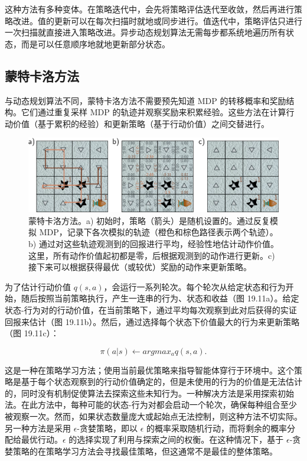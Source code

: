 这种方法有多种变体。在策略迭代中，会先将策略评估迭代至收敛，然后再进行策略改进。值的更新可以在每次扫描时就地或同步进行。值迭代中，策略评估只进行一次扫描就直接进入策略改进。异步动态规划算法无需每步都系统地遍历所有状态，而是可以任意顺序地就地更新部分状态。

\subsection{蒙特卡洛方法}
与动态规划算法不同，蒙特卡洛方法不需要预先知道 MDP 的转移概率和奖励结构。它们通过重复采样 MDP 的轨迹并观察奖励来积累经验。这些方法在计算行动价值（基于累积的经验）和更新策略（基于行动价值）之间交替进行。

\begin{figure}[ht!]
\centering
\includegraphics[width=0.7\linewidth]{png/chapter19/ReinforceMC.png}
\caption{蒙特卡洛方法。a) 初始时，策略（箭头）是随机设置的。通过反复模拟 MDP，记录下各次模拟的轨迹（橙色和棕色路径表示两个轨迹）。b) 通过对这些轨迹观测到的回报进行平均，经验性地估计动作价值。这里，所有动作价值起初都是零，后根据观测到的动作进行更新。c) 接下来可以根据获得最优（或较优）奖励的动作来更新策略。}
\end{figure}

为了估计行动价值 \(q(s, a)\)，会运行一系列轮次。每个轮次从给定状态和行为开始，随后按照当前策略执行，产生一连串的行为、状态和收益（图 19.11a）。给定状态-行为对的行动价值，在当前策略下，通过平均每次观察到此对后获得的实证回报来估计（图 19.11b）。然后，通过选择每个状态下价值最大的行为来更新策略（图 19.11c）：

\begin{equation}
\pi(a|s) \leftarrow argmax_a q(s, a). 
\end{equation}

这是一种在策略学习方法；使用当前最优策略来指导智能体穿行于环境中。这个策略是基于每个状态观察到的行动价值确定的，但是未使用的行为的价值是无法估计的，同时没有机制促使算法去探索这些未知行为。一种解决方法是采用探索初始法。在此方法中，每种可能的状态-行为对都会启动一个轮次，确保每种组合至少被观察一次。然而，如果状态数量庞大或起始点无法控制，则这种方法不切实际。另一种方法是采用 \(\epsilon\)-贪婪策略，即以 \(\epsilon\) 的概率采取随机行动，而将剩余的概率分配给最优行动。\(\epsilon\) 的选择实现了利用与探索之间的权衡。在这种情况下，基于 \(\epsilon\)-贪婪策略的在策略学习方法会寻找最佳策略，但这通常不是最佳的整体策略。

